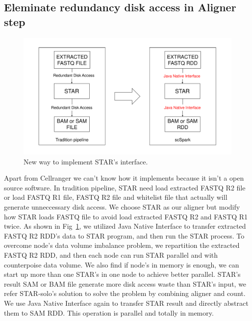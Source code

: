 \documentclass[runningheads]{llncs}
\begin{document}
\subsection{Eleminate redundancy disk access in Aligner step}
\begin{figure}
  \includegraphics[width=\textwidth]{fig2.pdf}
  \caption{New way to implement STAR's interface.} \label{fig2}
\end{figure}
Apart from Cellranger we can't know how it implements because it isn't a open source software.
In tradition pipeline, STAR need load extracted FASTQ R2 file or load FASTQ R1 file, FASTQ R2 file and whitelist file that actually will generate unneccessary disk access.  
We choose STAR as our aligner but modify how STAR loads FASTQ file to avoid load extracted FASTQ R2 and FASTQ R1 twice. 
As shown in Fig~\ref{fig2}, we utilized Java Native Interface to transfer extracted FASTQ R2 RDD's data to STAR program, and then run the STAR process.
To overcome node's data volume imbalance problem, we repartition the extracted FASTQ R2 RDD, and then each node can run STAR parallel and with counterpoise data volume.
We also find if node's in memory is enough, we can start up more than one STAR's in one node to achieve better parallel.
STAR's result SAM or BAM file generate more disk access waste than STAR's input, we refer STAR-solo's solution to solve the problem by combining aligner and count.
We use Java Native Interface again to transfer STAR result and directly abstract them to SAM RDD.
This operation is parallel and totally in memory.
\end{document}
